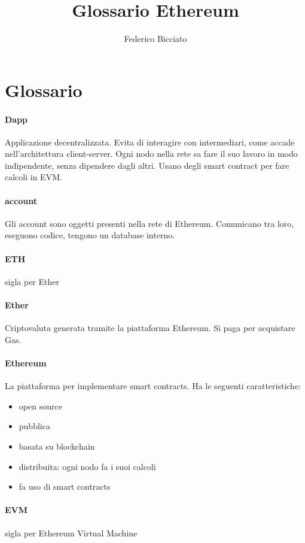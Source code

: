 \documentclass{book}
\title{Glossario Ethereum}
\author{Federico Bicciato}
\begin{document}
	\maketitle
	
	
	\section{Glossario}
		\paragraph{Dapp}
			Applicazione decentralizzata. Evita di interagire con intermediari, come accade nell'architettura client-server. Ogni nodo nella rete sa fare il suo lavoro in modo indipendente, senza dipendere dagli altri. Usano degli smart contract per fare calcoli in EVM.
		\paragraph{account}
			Gli account sono oggetti presenti nella rete di Ethereum. Comunicano tra loro, eseguono codice, tengono un database interno.
		\paragraph{ETH}
			sigla per Ether
		\paragraph{Ether}
			Criptovaluta generata tramite la piattaforma Ethereum. Si paga per acquistare Gas.
		\paragraph{Ethereum}
			La piattaforma per implementare smart contracts. Ha le seguenti caratteristiche:
			\begin{itemize}
				\item open source
				\item pubblica
				\item basata su blockchain
				\item distribuita: ogni nodo fa i suoi calcoli
				\item fa uso di smart contracts
			\end{itemize}
		\paragraph{EVM} sigla per Ethereum Virtual Machine
\end{document}
